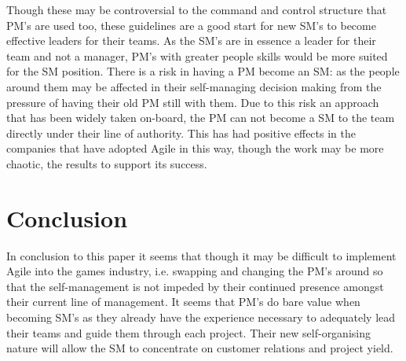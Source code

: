 \documentclass{scrartcl}
\begin{document}
Though these may be controversial to the command and control structure that PM's are used too, these guidelines are a good start for new SM's to become effective leaders for their teams\cite{Leader,AdoptAgile}. As the SM's are in essence a leader for their team and not a manager, PM's with greater people skills would be more suited for the SM position\cite{Together}. There is a risk in having a PM become an SM: as the people around them may be affected in their self-managing decision making from the pressure of having their old PM still with them\cite{ManagerMaster}. Due to this risk an approach that has been widely taken on-board, the PM can not become a SM to the team directly under their line of authority\cite{ManagerMaster,Together}. This has had positive effects in the companies that have adopted Agile in this way, though the work may be more chaotic\cite{Chaos}, the results to support its success\cite{LeaderUnleashed}.

\section{Conclusion}

In conclusion to this paper it seems that though it may be difficult to implement Agile into the games industry, i.e. swapping and changing the PM's around so that the self-management is not impeded by their continued presence amongst their current line of management. It seems that PM's do bare value when becoming SM's as they already have the experience necessary to adequately lead their teams and guide them through each project. Their new self-organising nature will allow the SM to concentrate on customer relations and project yield.



\end{document}
